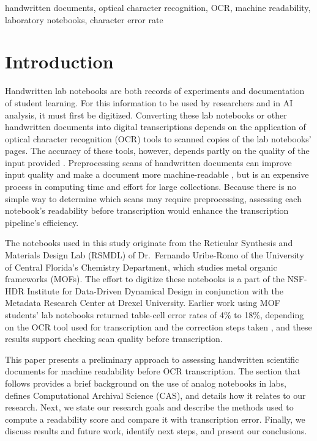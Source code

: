 \documentclass[conference]{IEEEtran}
\begin{document}
\begin{IEEEkeywords}
handwritten documents, optical character recognition, OCR, machine readability, laboratory notebooks, character error rate
\end{IEEEkeywords}

\section{Introduction}
Handwritten lab notebooks are both records of experiments and documentation of
student learning. For this information to be used by researchers and in AI
analysis, it must first be digitized. Converting these lab notebooks or other
handwritten documents into digital transcriptions depends on the application of
optical character recognition (OCR) tools to scanned copies of the lab
notebooks' pages. The accuracy of these tools, however, depends partly on the
quality of the input provided \cite{ye2013, alaei2024}. Preprocessing scans of
handwritten documents can improve input quality and make a document more
machine-readable \cite{sauvola2000, gonzalez2018}, but is an expensive process
in computing time and effort for large collections.
Because there is no simple way to determine which scans may require
preprocessing, assessing each notebook's readability before transcription would
enhance the transcription pipeline's efficiency.

The notebooks used in this study originate from the Reticular Synthesis and
Materials Design Lab (RSMDL) of Dr.\ Fernando Uribe-Romo of the University of
Central Florida's Chemistry Department, which studies metal organic frameworks
(MOFs). The effort to digitize these notebooks is a part of the NSF-HDR
Institute for Data-Driven Dynamical Design in conjunction with the Metadata
Research Center at Drexel University. Earlier work using MOF students' lab
notebooks returned table-cell error rates of 4\% to 18\%, depending on the OCR
tool used for transcription and the correction steps taken \cite{pepper2025},
and these results support checking scan quality before transcription.

This paper presents a preliminary approach to assessing handwritten scientific
documents for machine readability before OCR transcription. The section that
follows provides a brief background on the use of analog notebooks in labs,
defines Computational Archival Science (CAS), and details how it relates to our
research. Next, we state our research goals and describe the methods used to
compute a readability score and compare it with transcription error. Finally,
we discuss results and future work, identify next steps, and present our
conclusions.
\end{document}
